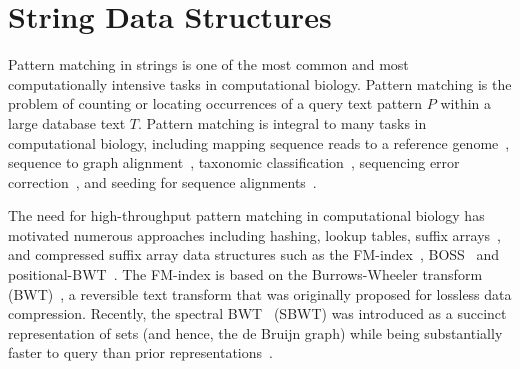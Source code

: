 
\section{String Data Structures}

%
Pattern matching in strings is one of the most common and most computationally intensive tasks in computational biology.
%
Pattern matching is the problem of counting or locating occurrences of a query text pattern $P$ within a large database text $T$. Pattern matching is integral to many tasks in computational biology, including mapping sequence reads to a reference genome~\cite{li2009fast,langmead2009ultrafast}, sequence to graph alignment~\cite{Jain2020}, taxonomic classification~\cite{menzel2016fast,kim2016centrifuge}, sequencing error correction~\cite{huang2017efficient}, and seeding for sequence alignments~\cite{buchfink2015fast,altschul1990basic,steinegger2017mmseqs2}.

The need for high-throughput pattern matching in computational biology has motivated numerous approaches including hashing, lookup tables, suffix arrays~\cite{manber1993suffix}, and compressed suffix array data structures such as the FM-index~\cite{ferragina2000opportunistic}, BOSS~\cite{Muggli2019} and positional-BWT~\cite{Durbin2014}.
The FM-index is based on the Burrows-Wheeler transform (BWT)~\cite{burrows1994block}, a reversible text transform that was originally proposed for lossless data compression.   Recently, the spectral BWT~\cite{alanko2023small} (SBWT) was introduced as a succinct representation of \kmer sets (and hence, the de Bruijn graph) while being substantially faster to query than prior representations~\cite{Muggli2019}.


